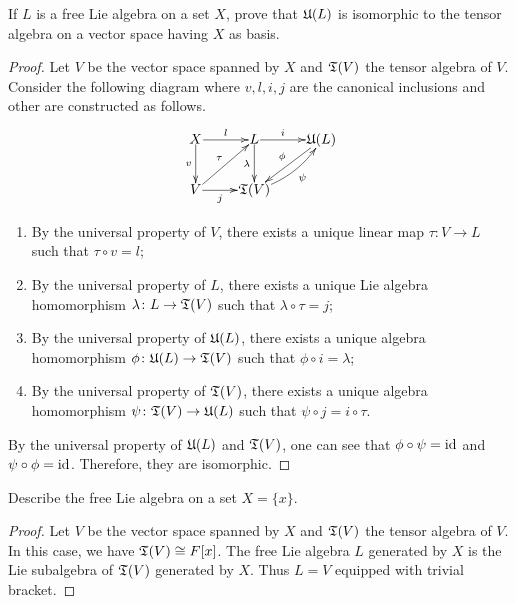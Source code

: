 \begin{ex}
	If $L$ is a free Lie algebra on a set $X$, prove that $\mathfrak{U}(L)$ is isomorphic to the tensor algebra on a vector space having $X$ as basis.
\end{ex}
\begin{proof}
	Let $V$ be the vector space spanned by $X$ and $\mathfrak{T}(V)$ the tensor algebra of $V$. Consider the following diagram where $v,l,i,j$ are the canonical inclusions and other are constructed as follows.
	\[
	\xymatrix@1{
		X\ar[d]_-{v}\ar[r]^-{l} & L\ar[d]_-{\lambda}\ar[r]^-{i} & \UUu(L)\ar[dl]_-{\phi} \\
		V\ar[r]_-{j}\ar[ur]^-{\tau} & \TTt(V)\ar@/_/[ur]_-{\psi} &
	}
	\]
	
	\begin{enumerate}
		\item By the universal property of $V$, there exists a unique linear map $\tau\colon V\to L$ such that $\tau\circ v = l$;
		\item By the universal property of $L$, there exists a unique Lie algebra homomorphism $\lambda\colon L\to\mathfrak{T}(V)$ such that $\lambda\circ\tau = j$;
		\item By the universal property of $\mathfrak{U}(L)$, there exists a unique algebra homomorphism $\phi\colon\mathfrak{U}(L)\to\mathfrak{T}(V)$ such that $\phi\circ i = \lambda$;
		\item By the universal property of $\mathfrak{T}(V)$, there exists a unique algebra homomorphism $\psi\colon\mathfrak{T}(V)\to\mathfrak{U}(L)$ such that $\psi\circ j = i\circ\tau$.
	\end{enumerate}
	
	By the universal property of $\mathfrak{U}(L)$ and $\mathfrak{T}(V)$, one can see that $\phi\circ\psi = \operatorname{id}$ and $\psi\circ\phi =\operatorname{id}$. Therefore, they are isomorphic.
\end{proof}

\begin{ex}
	Describe the free Lie algebra on a set $X = \{x\}$.
\end{ex}
\begin{proof}
	Let $V$ be the vector space spanned by $X$ and $\mathfrak{T}(V)$ the tensor algebra of $V$. In this case, we have $\mathfrak{T}(V) \cong F[x]$. The free Lie algebra $L$ generated by $X$ is the Lie subalgebra of $\mathfrak{T}(V)$ generated by $X$. Thus $L=V$ equipped with trivial bracket.
\end{proof}

